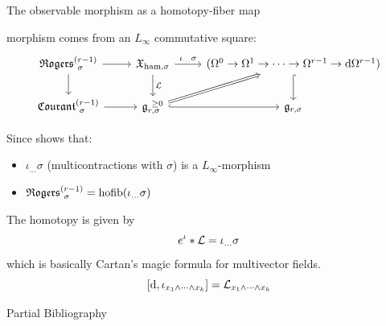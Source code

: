 \documentclass[beamer,10pt]{standalone}
\begin{document}
\begin{frame}{The observable morphism as a homotopy-fiber map}
	\begin{thmblock}
	\cite{Miti2024} morphism comes from an $L_\infty$ commutative square:
	\begin{displaymath}
		\begin{tikzcd}[ampersand replacement=\&]
			\Rogers[\sigma]{r-1} \ar[d] \ar[r] \&
			\X_{\ham,\sigma} \ar[r,"\iota_{\dots}\sigma"] \ar[d,"\Lie"]\&
			(\Omega^0\to\Omega^1\to\cdots\to\Omega^{r-1}\to \d \Omega^{r-1}) \ar[d,hook] 
			\\
			\Courant[\sigma]{r-1} \ar[r] \&
			\g_{r,\sigma}^{~\geq 0} \ar[r,hook] \ar[ur,Rightarrow]\&
			\g_{r,\sigma}
		\end{tikzcd}
	\end{displaymath}
	\end{thmblock}
	\vfill\pause

	Since \cite{Fiorenza2014a} shows that:
	\begin{itemize}
		\item[$\bullet$] $\iota_{\ldots}\sigma$ (multicontractions with $\sigma$) is a $L_\infty$-morphism
		\item[$\bullet$] $\Rogers[\sigma]{r-1} =\hofib(\iota_{\ldots}\sigma)$ 
	\end{itemize}
	\vfill\pause

	The homotopy is given by $$ e^{\iota} * \Lie = \iota_{\ldots}\sigma$$
	which is basically Cartan's magic formula for multivector fields.
	$$[\d, \iota_{x_1\wedge\cdots\wedge x_k}] = \Lie_{x_1\wedge\cdots\wedge x_k}$$
\end{frame}


 


\ifstandalone
\begin{frame}[t,allowframebreaks]{Partial Bibliography}
	\nocite{Miti2021}
	
	
\end{frame}
\fi
\end{document}
